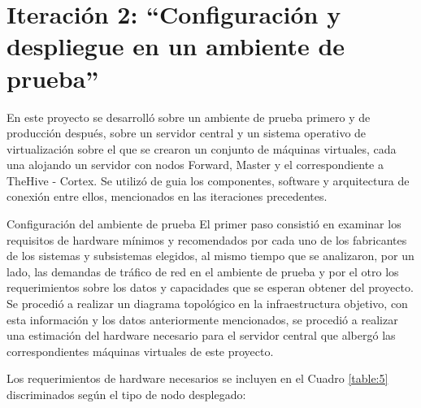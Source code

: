 \chapter{Iteración 2: “Configuración y despliegue en un ambiente de prueba”}
    En este proyecto se desarrolló sobre un ambiente de prueba primero y de producción después, sobre un servidor central y un sistema operativo de virtualización sobre el que se crearon un conjunto de máquinas virtuales, cada una alojando un servidor con nodos Forward, Master y el correspondiente a TheHive - Cortex. Se utilizó de guia los componentes, software y arquitectura de conexión entre ellos, mencionados en las iteraciones precedentes.
    
    \begin{section}{Configuración del ambiente de prueba}
        El primer paso consistió en examinar los requisitos de hardware mínimos y recomendados por cada uno de los fabricantes de los sistemas y subsistemas elegidos, al mismo tiempo que se analizaron, por un lado, las demandas de tráfico de red en el ambiente de prueba y por el otro los requerimientos sobre los datos y capacidades que se esperan obtener del proyecto. Se procedió a realizar un diagrama topológico en la infraestructura objetivo, con esta información y los datos anteriormente mencionados, se procedió a realizar una estimación del hardware necesario para el servidor central que albergó las correspondientes máquinas virtuales de este proyecto.\par
    	Los requerimientos de hardware necesarios se incluyen en el Cuadro \ref{table:5} discriminados según el tipo de nodo desplegado:
        \begin{table}[H]
        \centering
        \begin{tabular}{|m{9em}|m{9em}|m{9em}|m{9em}|}
        

\end{tabular}
\end{table}
\end{section}
